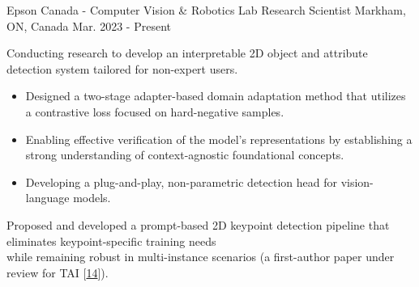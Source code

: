 

\vspace*{0.05cm}
\begin{cventries}

\cventry
{Epson Canada - Computer Vision \& Robotics Lab} %
{Research Scientist} %
{Markham, ON, Canada} %
{Mar. 2023 - Present} %
{ %
\begin{cvitems}
\item {Conducting research to develop an interpretable 2D object and attribute detection system tailored for non-expert users.}
\begin{itemize}[label=$\cdot$,leftmargin=0.7em]
\item{Designed a two-stage adapter-based domain adaptation method that utilizes a contrastive loss focused on hard-negative samples.}
\item{Enabling effective verification of the model’s representations by establishing a strong understanding of context-agnostic foundational concepts.}
\item{Developing a plug-and-play, non-parametric detection head for vision-language models.}
\end{itemize}
\item {Proposed and developed a prompt-based 2D keypoint detection pipeline that eliminates keypoint-specific training needs \\while remaining robust in multi-instance scenarios (a first-author paper under review for TAI [\hyperlink{LAM:TAI}{14}]).}

\end{cvitems}}
\end{cventries}
